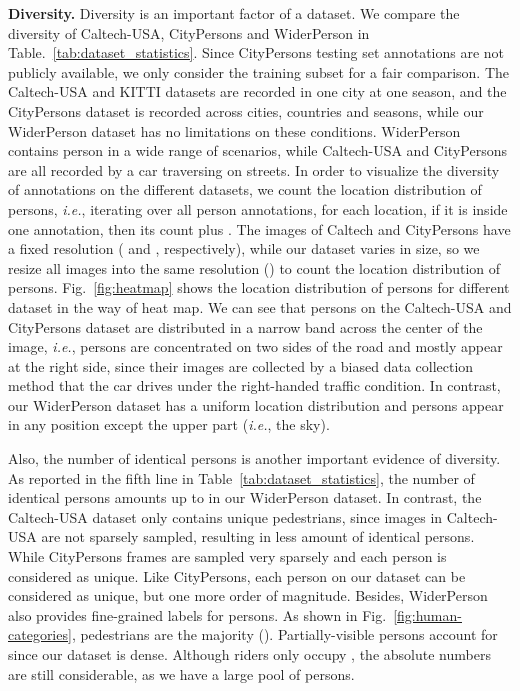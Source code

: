 \documentclass[journal]{IEEEtran}
\def\ie{{\em i.e.}}
\begin{document}
{\flushleft \textbf{Diversity. }}
Diversity is an important factor of a dataset. We compare the diversity of Caltech-USA, CityPersons and WiderPerson in Table.~\ref{tab:dataset_statistics}. Since CityPersons testing set annotations are not publicly available, we only consider the training subset for a fair comparison. The Caltech-USA and KITTI datasets are recorded in one city at one season, and the CityPersons dataset is recorded across  cities,  countries and seasons, while our WiderPerson dataset has no limitations on these conditions. WiderPerson contains person in a wide range of scenarios, while Caltech-USA and CityPersons are all recorded by a car traversing on streets. In order to visualize the diversity of annotations on the different datasets, we count the location distribution of persons, \ie, iterating over all person annotations, for each location, if it is inside one annotation, then its count plus . The images of Caltech and CityPersons have a fixed resolution ( and , respectively), while our dataset varies in size, so we resize all images into the same resolution () to count the location distribution of persons. Fig.~\ref{fig:heatmap} shows the location distribution of persons for different dataset in the way of heat map. We can see that persons on the Caltech-USA and CityPersons dataset are distributed in a narrow band across the center of the image, \ie, persons are concentrated on two sides of the road and mostly appear at the right side, since their images are collected by a biased data collection method that the car drives under the right-handed traffic condition. In contrast, our WiderPerson dataset has a uniform location distribution and persons appear in any position except the upper part (\ie, the sky).

Also, the number of identical persons is another important evidence of diversity. As reported in the fifth line in Table~\ref{tab:dataset_statistics}, the number of identical persons amounts up to  in our WiderPerson dataset. In contrast, the Caltech-USA dataset only contains  unique pedestrians, since images in Caltech-USA are not sparsely sampled, resulting in less amount of identical persons. While CityPersons frames are sampled very sparsely and each person is considered as unique. Like CityPersons, each person on our dataset can be considered as unique, but one more order of magnitude. Besides, WiderPerson also provides fine-grained labels for persons. As shown in Fig.~\ref{fig:human-categories}, pedestrians are the majority (). Partially-visible persons account for  since our dataset is dense. Although riders only occupy , the absolute numbers are still considerable, as we have a large pool of  persons.
\end{document}
